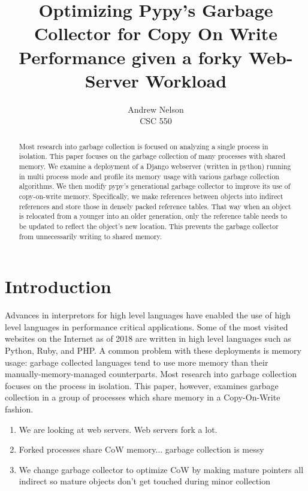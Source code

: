 \documentclass{article}
\begin{document}
\begin{titlepage}
\title{Optimizing Pypy's Garbage Collector for Copy On Write Performance given a forky Web-Server Workload}
\author{Andrew Nelson\\CSC 550}

\maketitle

\begin{abstract}
Most research into garbage collection is focused on analyzing a single process in isolation.  This paper focuses on the garbage collection of many processes with shared memory.  We examine a deployment of a Django webserver (written in python) running in multi process mode and profile its memory usage with various garbage collection algorithms.  We then modify pypy's generational garbage collector to improve its use of copy-on-write memory.  Specifically, we make references between objects into indirect references and store those in densely packed reference tables.  That way when an object is relocated from a younger into an older generation, only the reference table needs to be updated to reflect the object's new location.  This prevents the garbage collector from unnecessarily writing to shared memory.  
\end{abstract}
\end{titlepage}

\newpage

\tableofcontents

\newpage
{}
\twocolumn


\section{Introduction}
Advances in interpretors for high level languages have enabled the use of high level languages in performance critical applications.  Some of the most visited websites on the Internet as of 2018 are written in high level languages such as Python, Ruby, and PHP.  A common problem with these deployments is memory usage: garbage collected languages tend to use more memory than their manually-memory-managed counterparts.  Most research into garbage collection focuses on the process in isolation.  This paper, however, examines garbage collection in a group of processes which share memory in a Copy-On-Write fashion.  



\begin{enumerate}
\item We are looking at web servers.  Web servers fork a lot.
\item Forked processes share CoW memory... garbage collection is messy
\item We change garbage collector to optimize CoW by making mature pointers all indirect so mature objects don't get touched during minor collection
\end{enumerate}
\end{document}
